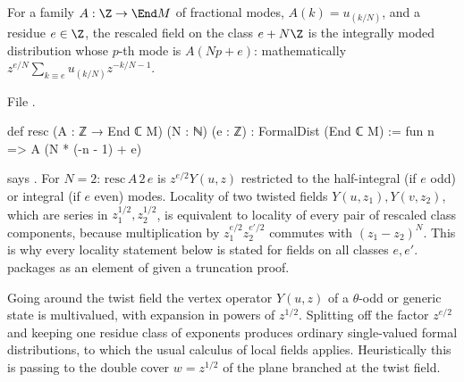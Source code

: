 \begin{definition}\label{ch08:def:resc}
For a family $A:\Z\to\End M$ of fractional modes, $A(k)=u_{(k/N)}$, and a residue $e\in\Z$, the
rescaled field on the class $e+N\Z$ is the integrally moded distribution whose $p$-th mode is
$A(Np+e)$: mathematically $z^{e/N}\sum_{k\equiv e}u_{(k/N)}z^{-k/N-1}$.
\end{definition}
\noindent File .
\begin{leancode}
def resc (A : ℤ → End ℂ M) (N : ℕ) (e : ℤ) : FormalDist (End ℂ M) :=
  fun n => A (N * (-n - 1) + e)
\end{leancode}
\begin{dictionary}
 says .  For $N=2$:
$\mathrm{resc}\,A\,2\,e$ is $z^{e/2}Y(u,z)$ restricted to the half-integral (if $e$ odd) or
integral (if $e$ even) modes.  Locality of two twisted fields $Y(u,z_1),Y(v,z_2)$, which are
series in $z_1^{1/2},z_2^{1/2}$, is equivalent to locality of every pair of rescaled class
components, because multiplication by $z_1^{e/2}z_2^{e'/2}$ commutes with $(z_1-z_2)^N$.  This is
why every locality statement below is stated for  fields on all classes $e,e'$.
 packages  as an element of  given a truncation proof.
\end{dictionary}

\begin{physics}
Going around the twist field the vertex operator $Y(u,z)$ of a $\theta$-odd or generic state is multivalued, with expansion in powers of $z^{1/2}$. Splitting off the factor $z^{e/2}$ and keeping one residue class of exponents produces ordinary single-valued formal distributions, to which the usual calculus of local fields applies. Heuristically this is passing to the double cover $w=z^{1/2}$ of the plane branched at the twist field.
\end{physics}

